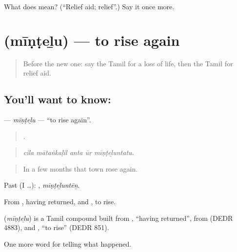 \begin{tcolorbox}[breakable,colback=teal!4,colframe=teal!35!black,title={Before you move on}]
What does  mean? (\textquotedblleft{}Relief aid; relief\textquotedblright{}.) Say it once more.
\end{tcolorbox}
\section[\texorpdfstring{\ta{மீண்டெழு} (mīṇṭeḻu)}{மீண்டெழு (mīṇṭeḻu)}]{ (mīṇṭeḻu) — to rise again}

\label{lesson:TA-C302-mintelu}



\begin{quote}
Before the new one: say the Tamil for a loss of life, then the Tamil for relief aid.
\end{quote}

\subsection*{You'll want to know: }
\textbf{} — \emph{mīṇṭeḻu} — \textquotedblleft{}to rise again\textquotedblright{}.

\begin{quote}
    .
\end{quote}

\begin{quote}
\emph{cila mātaṅkaḷil anta ūr mīṇṭeḻuntatu.}
\end{quote}

\begin{quote}
In a few months that town rose again.
\end{quote}

Past (I …): , \emph{mīṇṭeḻuntēṉ}.

From , having returned, and , to rise.

\begin{cousinweb}
\textbf{} (\emph{mīṇṭeḻu}) is a Tamil compound built from , \textquotedblleft{}having returned\textquotedblright{}, from  (DEDR 4883), and , \textquotedblleft{}to rise\textquotedblright{} (DEDR 851).
\end{cousinweb}

\begin{grammarlens}[title={What you've built}]
One more word for telling what happened.
\end{grammarlens}

